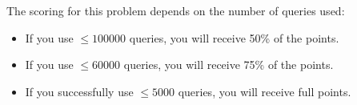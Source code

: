 The scoring for this problem depends on the number of queries used:

\begin{itemize}
    \item If you use $\leq 100000$ queries, you will receive 50\% of the points.
    \item If you use $\leq 60000$ queries, you will receive 75\% of the points.
    \item If you successfully use $\leq 5000$ queries, you will receive full points.
\end{itemize}